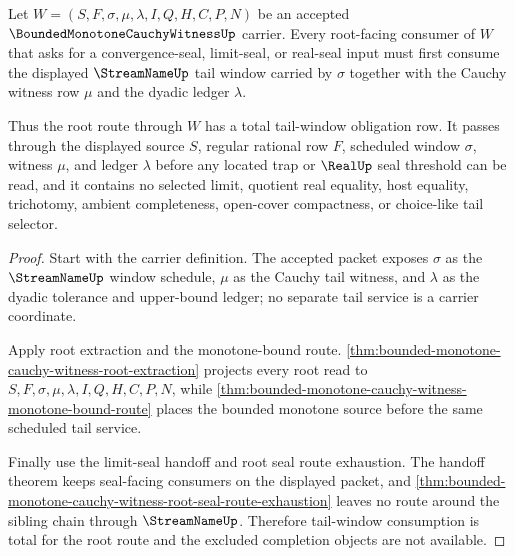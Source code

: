 \begin{theorem}
\label{thm:bounded-monotone-cauchy-witness-root-tail-window-totality}
Let $W=(S,F,\sigma,\mu,\lambda,I,Q,H,C,P,N)$ be an accepted $\BoundedMonotoneCauchyWitnessUp$ carrier. Every root-facing consumer of $W$ that asks for a convergence-seal, limit-seal, or real-seal input must first consume the displayed $\StreamNameUp$ tail window carried by $\sigma$ together with the Cauchy witness row $\mu$ and the dyadic ledger $\lambda$.

Thus the root route through $W$ has a total tail-window obligation row. It passes through the displayed source $S$, regular rational row $F$, scheduled window $\sigma$, witness $\mu$, and ledger $\lambda$ before any located trap or $\RealUp$ seal threshold can be read, and it contains no selected limit, quotient real equality, host equality, trichotomy, ambient completeness, open-cover compactness, or choice-like tail selector.
\end{theorem}
\begin{proof}
Start with the carrier definition. The accepted packet exposes $\sigma$ as the $\StreamNameUp$ window schedule, $\mu$ as the Cauchy tail witness, and $\lambda$ as the dyadic tolerance and upper-bound ledger; no separate tail service is a carrier coordinate.

Apply root extraction and the monotone-bound route. \autoref{thm:bounded-monotone-cauchy-witness-root-extraction} projects every root read to $S,F,\sigma,\mu,\lambda,I,Q,H,C,P,N$, while \autoref{thm:bounded-monotone-cauchy-witness-monotone-bound-route} places the bounded monotone source before the same scheduled tail service.

Finally use the limit-seal handoff and root seal route exhaustion. The handoff theorem keeps seal-facing consumers on the displayed packet, and \autoref{thm:bounded-monotone-cauchy-witness-root-seal-route-exhaustion} leaves no route around the sibling chain through $\StreamNameUp$. Therefore tail-window consumption is total for the root route and the excluded completion objects are not available.
\end{proof}

